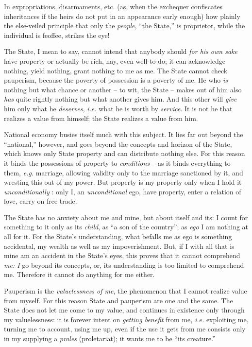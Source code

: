 \documentclass[12pt,a4paper]{book}
\begin{document}
In expropriations, disarmaments, etc. (as, when the exchequer confiscates 
inheritances if the heirs do not put in an appearance early enough) how 
plainly the else-veiled principle that only the \textit{people}, ``the 
State,'' is proprietor, while the individual is feoffee, strikes the eye!

The State, I mean to say, cannot intend that anybody should \textit{for his 
own sake} have property or actually be rich, nay, even well-to-do; it can 
acknowledge nothing, yield nothing, grant nothing to me as me. The State 
cannot check pauperism, because the poverty of possession is a poverty of me. 
He who \textit{is} nothing but what chance or another -- to wit, the State -- 
makes out of him also \textit{has} quite rightly nothing but what another 
gives him. And this other will \textit{give} him only what he 
\textit{deserves}, \textit{i.e.} what he is worth by \textit{service}. It is 
not he that realizes a value from himself; the State realizes a value from 
him.

National economy busies itself much with this subject. It lies far out beyond 
the ``national,'' however, and goes beyond the concepts and horizon of the 
State, which knows only State property and can distribute nothing else. For 
this reason it binds the possessions of property to \textit{conditions --} as 
it binds everything to them, \textit{e.g.} marriage, allowing validity only 
to the marriage sanctioned by it, and wresting this out of my power. But 
property is my property only when I hold it \textit{unconditionally} : only I, 
an \textit{unconditional} ego, have property, enter a relation of love, carry 
on free trade.

The State has no anxiety about me and mine, but about itself and its: I count 
for something to it only as its \textit{child}, as ``a son of the country''; 
as \textit{ego} I am nothing at all for it. For the State's understanding, 
what befalls me as ego is something accidental, my wealth as well as my 
impoverishment. But, if I with all that is mine am an accident in the State's 
eyes, this proves that it cannot comprehend \textit{me: I} go beyond its 
concepts, or, its understanding is too limited to comprehend me. Therefore it 
cannot do anything for me either.

Pauperism is the \textit{valuelessness of me}, the phenomenon that I cannot 
realize value from myself. For this reason State and pauperism are one and the 
same. The State does not let me come to my value, and continues in existence 
only through my valuelessness: it is forever intent on \textit{getting 
benefit} from me, \textit{i.e.} exploiting me, turning me to account, using me 
up, even if the use it gets from me consists only in my supplying a 
\textit{proles} (proletariat); it wants me to be ``its creature.''
\end{document}
